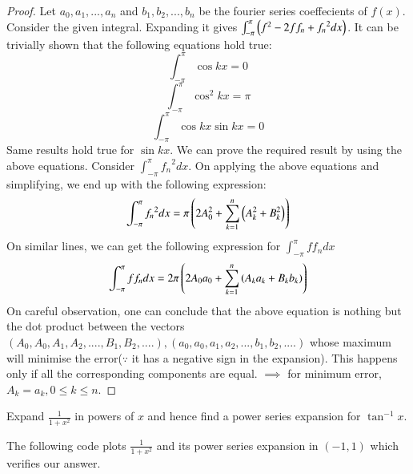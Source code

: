 \documentclass[journal,12pt,twocolumn]{IEEEtran}
\begin{document}
\begin{proof}
Let $a_0,a_1,...,a_n$ and $b_1,b_2,...,b_n$ be the fourier series coeffecients of $f(x)$. Consider the given integral. Expanding it gives $\int_{-\pi}^{\pi}\left(f^2-2ff_n+{f_n}^2 dx\right)$. It can be trivially shown that the following equations hold true:
\begin{equation}
\int_{-\pi}^{\pi}\cos kx=0
\end{equation}
\begin{equation}
\int_{-\pi}^{\pi}\cos^2 kx=\pi
\end{equation}
\begin{equation}
\int_{-\pi}^{\pi}\cos kx\sin kx=0
\end{equation}
Same results hold true for $\sin kx$. We can prove the required result by using the above equations. Consider $\int_{-\pi}^{\pi}{f_n}^2 dx$. On applying the above equations and simplifying, we end up with the following expression:
\begin{equation}
\int_{-\pi}^{\pi}{f_n}^2 dx = \pi\left(2A_0^2+\sum_{k=1}^{n}\left(A_k^2+B_k^2\right)\right)
\end{equation}
On similar lines, we can get the following expression for $\int_{-\pi}^{\pi}ff_n dx$
\begin{equation}
\int_{-\pi}^{\pi}ff_n dx = 2\pi\left(2A_0a_0+\sum_{k=1}^{n}\left(A_ka_k+B_kb_k\right)\right)
\end{equation}
On careful observation, one can conclude that the above equation is nothing but the dot product between the vectors $(A_0,A_0,A_1,A_2,....,B_1,B_2,....),(a_0,a_0,a_1,a_2,...,b_1,b_2,....)$ whose maximum will minimise the error($\because$ it has a negative sign in the expansion). This happens only if all the corresponding components are equal. $\implies$ for minimum error, $A_k=a_k, 0 \le k\le n$.  
\end{proof}
\begin{problem}
Expand $\frac{1}{1+x^2}$ in powers of $x$ and hence find a power series expansion for $\tan^{-1} x$.
\end{problem}
\solution
The following code plots $\frac{1}{1+x^2}$ and its power series expansion in $(-1,1)$ which verifies our answer. 

%
\end{document}
